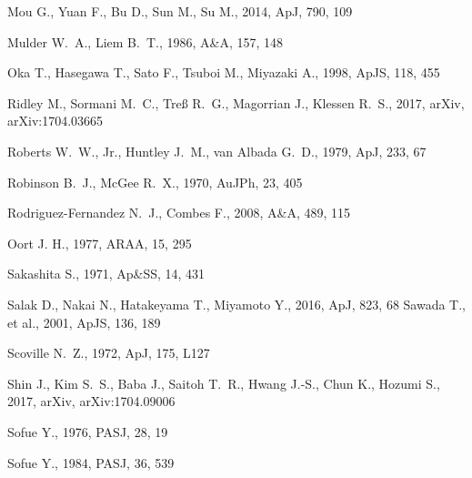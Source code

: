 \documentclass[useAMS,usenatbib]{mn2e}
\begin{document}
\begin{thebibliography}{}
Mou G., Yuan F., Bu D., Sun M., Su M., 2014, ApJ, 790, 109 
  
 Mulder W.~A., Liem B.~T., 1986, A\&A, 157, 148 
 

 Oka T., Hasegawa T., Sato F., Tsuboi M., Miyazaki A., 1998, ApJS, 118, 455  

 Ridley M., Sormani M.~C., Tre{\ss} R.~G., Magorrian J., Klessen R.~S., 2017, arXiv, arXiv:1704.03665 

 Roberts W.~W., Jr., Huntley J.~M., van Albada G.~D., 1979, ApJ, 233, 67 %

 Robinson B.~J., McGee R.~X., 1970, AuJPh, 23, 405 

 Rodriguez-Fernandez N.~J., Combes F., 2008, A\&A, 489, 115 

 Oort J. H., 1977, ARAA, 15, 295 

 Sakashita S., 1971, Ap\&SS, 14, 431  

 Salak D., Nakai N., Hatakeyama T., Miyamoto Y., 2016, ApJ, 823, 68 %
 Sawada T., et al., 2001, ApJS, 136, 189   

 Scoville N.~Z., 1972, ApJ, 175, L127  

 Shin J., Kim S.~S., Baba J., Saitoh T.~R., Hwang J.-S., Chun K., Hozumi S., 2017, arXiv, arXiv:1704.09006  

 Sofue Y., 1976, PASJ, 28, 19  

 Sofue Y., 1984, PASJ, 36, 539   


\end{thebibliography}
\end{document}
